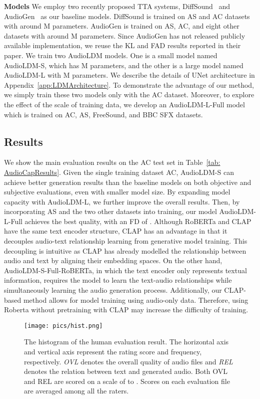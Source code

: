 \documentclass{article}
\begin{document}
\textbf{Models} We employ two recently proposed TTA systems, DiffSound~\cite{yang2022diffsound} and AudioGen~\cite{kreuk2022audiogen} as our baseline models. DiffSound is trained on AS and AC datasets with around M parameters. AudioGen is trained on AS, AC, and eight other datasets with around M parameters. Since AudioGen has not released publicly available implementation, we reuse the KL and FAD results reported in their paper. We train two AudioLDM models. One is a small model named AudioLDM-S, which has M parameters, and the other is a large model named AudioLDM-L with M parameters. We describe the details of UNet architecture in Appendix~\ref{app:LDMArchitecture}. To demonstrate the advantage of our method, we simply train these two models only with the AC dataset. Moreover, to explore the effect of the scale of training data, we develop an AudioLDM-L-Full model which is trained on AC, AS, FreeSound, and BBC SFX datasets. 





\subsection{Results}

We show the main evaluation results on the AC test set in Table~\ref{tab: AudioCapResults}. Given the single training dataset AC, AudioLDM-S can achieve better generation results than the baseline models on both objective and subjective evaluations, even with smaller model size. By expanding model capacity with AudioLDM-L, we further improve the overall results. Then, by incorporating AS and the two other datasets into training, our model AudioLDM-L-Full achieves the best quality, with an FD of . 
Although RoBERTa and CLAP have the same text encoder structure, CLAP has an advantage in that it decouples audio-text relationship learning from generative model training. This decoupling is intuitive as CLAP has already modelled the relationship between audio and text by aligning their embedding spaces. On the other hand, AudioLDM-S-Full-RoBERTa, in which the text encoder only represents textual information, requires the model to learn the text-audio relationships while simultaneously learning the audio generation process. Additionally, our CLAP-based method allows for model training using audio-only data. Therefore, using Roberta without pretraining with CLAP may increase the difficulty of training.

\begin{figure*}[tbp]
    \centering
    \texttt{[image: pics/hist.png]}
\caption{The histogram of the human evaluation result. The horizontal axis and vertical axis represent the rating score and frequency, respectively. \textit{OVL} denotes the overall quality of audio files and \textit{REL} denotes the relation between text and generated audio. Both OVL and REL are scored on a scale of  to . Scores on each evaluation file are averaged among all the raters.}
    \label{fig:hist-human-evaluation}
\end{figure*}
\end{document}
